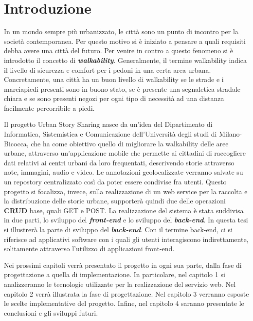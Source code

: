 \chapter*{Introduzione}

In un mondo sempre più urbanizzato, le città sono un punto di incontro per la società contemporanea. Per questo motivo si è iniziato a pensare a quali requisiti debba avere una città del futuro. Per venire in contro a questo fenomeno si è introdotto il concetto di \textit{\textbf{walkability}}. Generalmente, il termine walkability indica il livello di sicurezza e comfort per i pedoni in una certa area urbana. Concretamente, una città ha un buon livello di walkability se le strade e i marciapiedi presenti sono in buono stato, se è presente una segnaletica stradale chiara e se sono presenti negozi per ogni tipo di necessità ad una distanza facilmente percorribile a piedi.

Il progetto Urban Story Sharing nasce da un'idea del Dipartimento di Informatica, Sistemistica e Comunicazione dell'Università degli studi di Milano-Bicocca, che ha come obiettivo quello di migliorare la walkability delle aree urbane, attraverso un'applicazione mobile che permette ai cittadini di raccogliere dati relativi ai centri urbani da loro frequentati, descrivendo storie attraverso note, immagini, audio e video. Le annotazioni geolocalizzate verranno salvate su un repostory centralizzato così da poter essere condivise fra utenti. Questo progetto si focalizza, invece, sulla realizzazione di un web service per la raccolta e la distribuzione delle storie urbane, supporterà quindi due delle operazioni \textbf{CRUD} base, quali GET e POST. 
La realizzazione del sistema è stata suddivisa in due parti, lo sviluppo del \textit{\textbf{front-end}} e lo sviluppo del \textit{\textbf{back-end}}.
In questa tesi si illustrerà la parte di sviluppo del \textit{\textbf{back-end}}.
Con il termine back-end, ci si riferisce ad applicativi software con i quali gli utenti interagiscono indirettamente, solitamente attraverso l'utilizzo di applicazioni front-end.

Nei prossimi capitoli verrà presentato il progetto in ogni sua parte, dalla fase di progettazione a quella di implementazione.  In particolare, nel capitolo 1 si analizzeranno le tecnologie utilizzate per la realizzazione del servizio web. Nel capitolo 2 verrà illustrata la fase di progettazione. Nel capitolo 3 verranno esposte le scelte implementative del progetto. Infine, nel capitolo 4 saranno presentate le conclusioni e gli sviluppi futuri.

